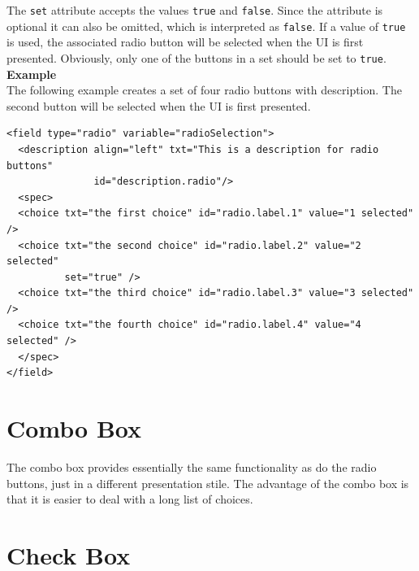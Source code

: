 The \texttt{set} attribute accepts the values \texttt{true} and
\texttt{false}. Since the attribute is optional it can also be omitted,
which is interpreted as \texttt{false}. If a value of \texttt{true} is
used, the associated radio button will be selected when the UI is first
presented. Obviously, only one of the buttons in a set should be set to
\texttt{true}.\\

\textbf{Example}\\

The following example creates a set of four radio buttons with
description. The second button will be selected when the UI is first
presented.\\

\footnotesize
\begin{verbatim}
<field type="radio" variable="radioSelection">
  <description align="left" txt="This is a description for radio buttons"
               id="description.radio"/>
  <spec>
  <choice txt="the first choice" id="radio.label.1" value="1 selected" />
  <choice txt="the second choice" id="radio.label.2" value="2 selected"
          set="true" />
  <choice txt="the third choice" id="radio.label.3" value="3 selected" />
  <choice txt="the fourth choice" id="radio.label.4" value="4 selected" />
  </spec>
</field>
\end{verbatim}
\normalsize

\section{Combo Box}

The combo box provides essentially the same functionality as do the
radio buttons, just in a different presentation stile. The advantage of
the combo box is that it is easier to deal with a long list of
choices.\\

\section{Check Box}

